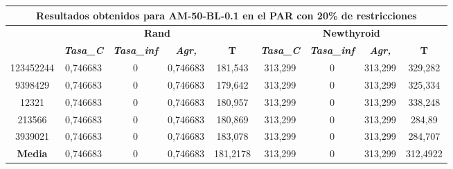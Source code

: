 \documentclass[12pt, spanish]{article}
\begin{document}
\begin{table}[H]
\footnotesize
\begin{tabular}{|c|c|c|c|c|c|c|c|c|}
\hline
\multicolumn{9}{|c|}{\textbf{Resultados obtenidos para AM-50-BL-0.1 en el PAR con 20\% de restricciones}}                                                                                                         \\ \hline
\multirow{2}{*}{} & \multicolumn{4}{c|}{\textbf{Rand}}                                                            & \multicolumn{4}{c|}{\textbf{Newthyroid}}                                                      \\ \cline{2-9} 
                  & \textit{\textbf{Tasa\_C}} & \textit{\textbf{Tasa\_inf}} & \textit{\textbf{Agr,}} & \textbf{T} & \textit{\textbf{Tasa\_C}} & \textit{\textbf{Tasa\_inf}} & \textit{\textbf{Agr,}} & \textbf{T} \\ \hline
123452244         & 0,746683                  & 0                           & 0,746683               & 181,543    & 313,299                   & 0                           & 313,299                & 329,282    \\ \hline
9398429           & 0,746683                  & 0                           & 0,746683               & 179,642    & 313,299                   & 0                           & 313,299                & 325,334    \\ \hline
12321             & 0,746683                  & 0                           & 0,746683               & 180,957    & 313,299                   & 0                           & 313,299                & 338,248    \\ \hline
213566            & 0,746683                  & 0                           & 0,746683               & 180,869    & 313,299                   & 0                           & 313,299                & 284,89     \\ \hline
3939021           & 0,746683                  & 0                           & 0,746683               & 183,078    & 313,299                   & 0                           & 313,299                & 284,707    \\ \hline
\textbf{Media}    & 0,746683                  & 0                           & 0,746683               & 181,2178   & 313,299                   & 0                           & 313,299                & 312,4922   \\ \hline
\end{tabular}
\end{table}
\end{document}
